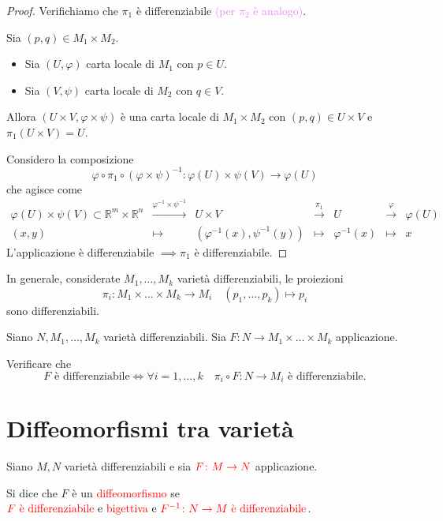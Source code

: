         \begin{proof}
        \mbox{}

        Verifichiamo che $\pi_1$ è differenziabile \textcolor{violet}{(per $\pi_2$ è analogo)}. 
        
        Sia $(p,q) \in M_1 \times M_2$.
        \begin{itemize}
            \item Sia $(U, \varphi)$ carta locale di $M_1$ con $p \in U$.
            \item Sia $(V, \psi)$ carta locale di $M_2$ con $q \in V$.
        \end{itemize}
        Allora $(U \times V, \varphi \times \psi)$ è una carta locale di $M_1 \times M_2$ con $(p,q) \in U \times V$ e $\pi_1(U \times V) = U$.
        
        Considero la composizione
        \[
        \varphi \circ \pi_1 \circ (\varphi \times \psi)^{-1} : \varphi(U) \times \psi(V) \longrightarrow \varphi(U)
        \]
        che agisce come
        \[
        \begin{array}{ccccccc}
        \varphi(U) \times \psi(V) \subset \mathbb{R}^m \times \mathbb{R}^n & \xrightarrow{\varphi^{-1} \times \psi^{-1}} & U \times V & \xrightarrow{\ \pi_1 \ } & U & \xrightarrow{\ \varphi \ } & \varphi(U) \\
        (x,y) & \longmapsto & (\varphi^{-1}(x), \psi^{-1}(y)) & \longmapsto & \varphi^{-1}(x) & \longmapsto & x
        \end{array}
        \]
        L'applicazione è differenziabile $\implies \pi_1$ è differenziabile.
        \end{proof}

        In generale, considerate $M_1, \dots, M_k$ varietà differenziabili, le proiezioni
        \[
        \pi_i : M_1 \times \dots \times M_k \longrightarrow M_i \quad (p_1, \dots, p_k) \longmapsto p_i
        \]
        sono differenziabili.

        \begin{esempio}
        \mbox{}

        Siano $N, M_1, \dots, M_k$ varietà differenziabili. Sia $F : N \longrightarrow M_1 \times \dots \times M_k$ applicazione. 
        
        Verificare che
        \[
        F \text{ è differenziabile} \iff \forall i = 1, \dots, k \quad \pi_i \circ F : N \longrightarrow M_i \text{ è differenziabile.}
        \]
        \end{esempio}
    \section{Diffeomorfismi tra varietà}
        \begin{definizione}
        \mbox{}

        Siano $M, N$ varietà differenziabili e sia $\textcolor{red}{F \colon M \to N}$ applicazione.

        Si dice che $F$ è un \textcolor{red}{diffeomorfismo} se $\textcolor{red}{F \text{ è differenziabile \textcolor{black}{e} bigettiva \textcolor{black}{e} } F^{-1} \colon N \to M \text{ è differenziabile}}$.
        \end{definizione}

